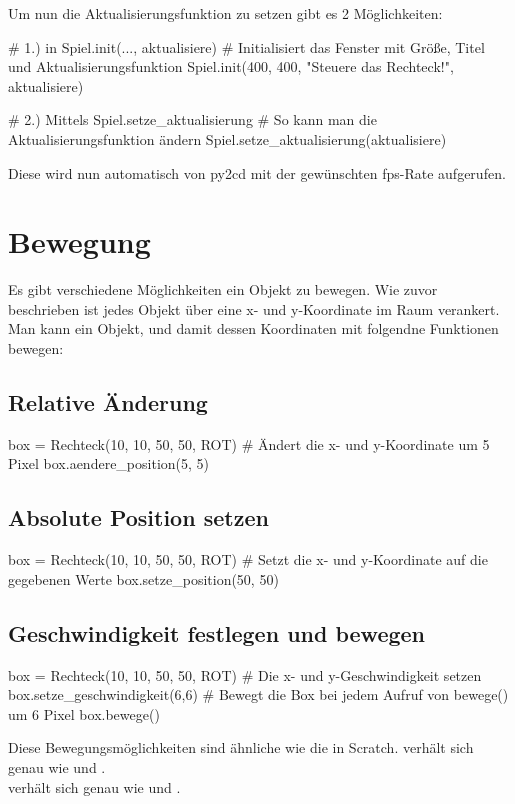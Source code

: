 \documentclass{\VorlagenPfad/coderdojokatext}
\begin{document}
Um nun die Aktualisierungsfunktion zu setzen gibt es 2 Möglichkeiten:
\begin{pythoncode}
# 1.) in Spiel.init(..., aktualisiere)
# Initialisiert das Fenster mit Größe, Titel und Aktualisierungsfunktion
Spiel.init(400, 400, "Steuere das Rechteck!", aktualisiere)

# 2.) Mittels Spiel.setze_aktualisierung
# So kann man die Aktualisierungsfunktion ändern
Spiel.setze_aktualisierung(aktualisiere)
\end{pythoncode}
Diese wird nun automatisch von py2cd mit der gewünschten fps-Rate aufgerufen.

\section{Bewegung}
Es gibt verschiedene Möglichkeiten ein Objekt zu bewegen. Wie zuvor beschrieben ist jedes Objekt über eine x- und y-Koordinate im Raum verankert. Man kann ein Objekt, und damit dessen Koordinaten mit folgendne Funktionen bewegen:

\subsection{Relative Änderung}
\begin{pythoncode}
box = Rechteck(10, 10, 50, 50, ROT)
# Ändert die x- und y-Koordinate um 5 Pixel
box.aendere_position(5, 5)
\end{pythoncode}

\subsection{Absolute Position setzen}
\begin{pythoncode}
box = Rechteck(10, 10, 50, 50, ROT)
# Setzt die x- und y-Koordinate auf die gegebenen Werte
box.setze_position(50, 50)
\end{pythoncode}

\subsection{Geschwindigkeit festlegen und bewegen}
\begin{pythoncode}
box = Rechteck(10, 10, 50, 50, ROT)
# Die x- und y-Geschwindigkeit setzen
box.setze_geschwindigkeit(6,6)
# Bewegt die Box bei jedem Aufruf von bewege() um 6 Pixel
box.bewege()
\end{pythoncode}

Diese Bewegungsmöglichkeiten sind ähnliche wie die in Scratch.  verhält sich genau wie  und .
\\
 verhält sich genau wie  und .
\end{document}
